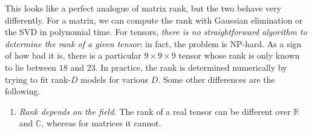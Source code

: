   This looks like a perfect analogue of matrix rank, but the two behave very differently. For a matrix, we can compute the rank with Gaussian elimination or the SVD in polynomial time. For tensors, \textit{there is no straightforward algorithm to determine the rank of a given tensor}; in fact, the problem is NP-hard. As a sign of how bad it is, there is a particular $9 \times 9 \times 9$ tensor whose rank is only known to lie between $18$ and $23$. In practice, the rank is determined numerically by trying to fit rank-$D$ models for various $D$. Some other differences are the following.

  \begin{enumerate}
    \item \textit{Rank depends on the field.} The rank of a real tensor can be different over $\mathbb{R}$ and $\mathbb{C}$, whereas for matrices it cannot.


\end{enumerate}
